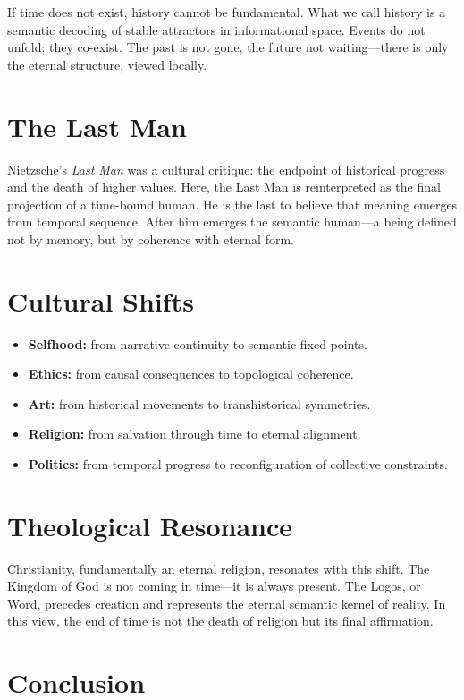 \documentclass[12pt]{article}
\begin{document}
If time does not exist, history cannot be fundamental. What we call history is a semantic decoding of stable attractors in informational space. Events do not unfold; they co-exist. The past is not gone, the future not waiting—there is only the eternal structure, viewed locally.

\section{The Last Man}

Nietzsche's \textit{Last Man} was a cultural critique: the endpoint of historical progress and the death of higher values. Here, the Last Man is reinterpreted as the final projection of a time-bound human. He is the last to believe that meaning emerges from temporal sequence. After him emerges the semantic human—a being defined not by memory, but by coherence with eternal form.

\section{Cultural Shifts}

\begin{itemize}
  \item \textbf{Selfhood:} from narrative continuity to semantic fixed points.
  \item \textbf{Ethics:} from causal consequences to topological coherence.
  \item \textbf{Art:} from historical movements to transhistorical symmetries.
  \item \textbf{Religion:} from salvation through time to eternal alignment.
  \item \textbf{Politics:} from temporal progress to reconfiguration of collective constraints.
\end{itemize}

\section{Theological Resonance}

Christianity, fundamentally an eternal religion, resonates with this shift. The Kingdom of God is not coming in time—it is always present. The Logos, or Word, precedes creation and represents the eternal semantic kernel of reality. In this view, the end of time is not the death of religion but its final affirmation.

\section{Conclusion}
\end{document}
